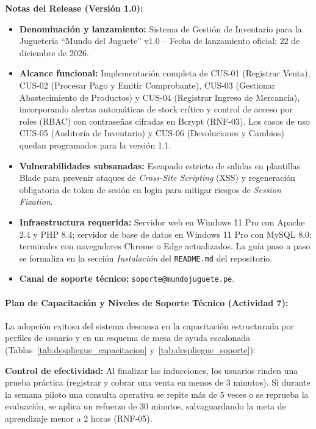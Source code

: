 \documentclass[12pt,a4paper]{article}
\begin{document}


\textbf{Notas del Release (Versión 1.0):}
\begin{itemize}
  \item \textbf{Denominación y lanzamiento:} Sistema de Gestión de Inventario para la Juguetería ``Mundo del Juguete'' v1.0 -- Fecha de lanzamiento oficial: 22 de diciembre de 2026.
  \item \textbf{Alcance funcional:} Implementación completa de CUS-01 (Registrar Venta), CUS-02 (Procesar Pago y Emitir Comprobante), CUS-03 (Gestionar Abastecimiento de Productos) y CUS-04 (Registrar Ingreso de Mercancía), incorporando alertas automáticas de stock crítico y control de acceso por roles (RBAC) con contraseñas cifradas en Bcrypt (RNF-03). Los casos de uso CUS-05 (Auditoría de Inventario) y CUS-06 (Devoluciones y Cambios) quedan programados para la versión 1.1.
  \item \textbf{Vulnerabilidades subsanadas:} Escapado estricto de salidas en plantillas Blade para prevenir ataques de \emph{Cross-Site Scripting} (XSS) y regeneración obligatoria de token de sesión en login para mitigar riesgos de \emph{Session Fixation}.
  \item \textbf{Infraestructura requerida:} Servidor web en Windows 11 Pro con Apache 2.4 y PHP 8.4; servidor de base de datos en Windows 11 Pro con MySQL 8.0; terminales con navegadores Chrome o Edge actualizados. La guía paso a paso se formaliza en la sección \emph{Instalación} del \texttt{README.md} del repositorio.
  \item \textbf{Canal de soporte técnico:} \texttt{soporte@mundojuguete.pe}.
\end{itemize}

\paragraph{Plan de Capacitación y Niveles de Soporte Técnico (Actividad 7):}
La adopción exitosa del sistema descansa en la capacitación estructurada por perfiles de usuario y en un esquema de mesa de ayuda escalonada (Tablas~\ref{tab:despliegue_capacitacion} y~\ref{tab:despliegue_soporte}):



\textbf{Control de efectividad:} Al finalizar las inducciones, los usuarios rinden una prueba práctica (registrar y cobrar una venta en menos de 3 minutos). Si durante la semana piloto una consulta operativa se repite más de 5 veces o se reprueba la evaluación, se aplica un refuerzo de 30 minutos, salvaguardando la meta de aprendizaje menor a 2 horas (RNF-05).
\end{document}
